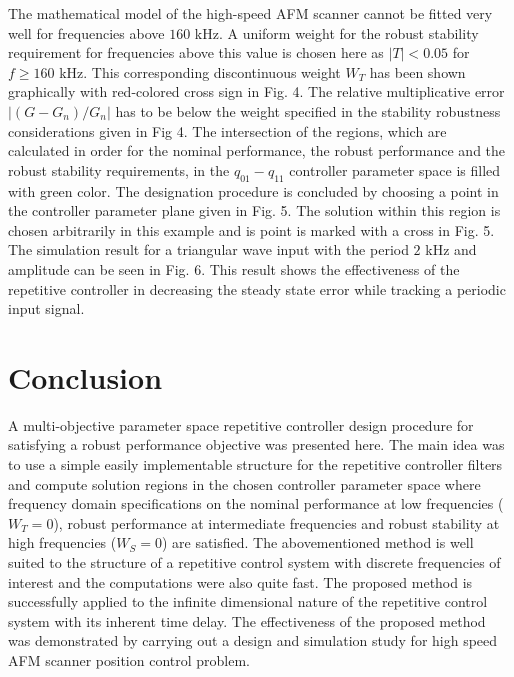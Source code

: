 \documentclass[12pt,draftcls,onecolumn]{IEEEtran}
\begin{document}
The mathematical model of the high-speed AFM scanner cannot be fitted very well for frequencies above $160$ kHz. A uniform weight
for the robust stability requirement for frequencies above this value is chosen here as $\vert T \vert < 0.05$ for $f \geq 160$ kHz. This
corresponding discontinuous weight $W_{T}$ has been shown graphically with red-colored cross sign in Fig. 4. The relative
multiplicative error $\vert (G-G_{n})/G_{n} \vert$ has to be below the weight specified in the stability robustness considerations given
in Fig 4. The intersection of the regions, which are calculated in order for the nominal performance, the robust performance and the
robust stability requirements, in the $q_{01}-q_{11}$ controller parameter space is filled with green color. The designation
procedure is concluded by choosing a point in the controller parameter plane given in Fig. 5. The solution within this region
is chosen arbitrarily in this example and is point is marked with a cross in Fig. 5. The simulation result for a triangular wave
input with the period $2$ kHz and amplitude can be seen in Fig. 6. This result shows the effectiveness of the repetitive controller
in decreasing the steady state error while tracking a periodic input signal.

\section{Conclusion}

A multi-objective parameter space repetitive controller design procedure for satisfying a robust performance objective was
presented here. The main idea was to use a simple easily implementable structure for the repetitive controller filters and
compute solution regions in the chosen controller parameter space where frequency domain specifications on the nominal performance
at low frequencies ($W_{T}=0$), robust performance at intermediate frequencies and robust stability at high frequencies ($W_{S}=0$)
are satisfied. The abovementioned method is well suited to the structure of a repetitive control system with discrete frequencies
of interest and the computations were also quite fast. The proposed method is successfully applied to the infinite
dimensional nature of the repetitive control system with its inherent time delay. The effectiveness of the proposed method was
demonstrated by carrying out a design and simulation study for high speed AFM scanner position control problem.




\end{document}
